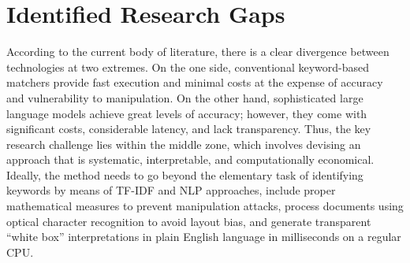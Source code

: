 \section{Identified Research Gaps}
According to the current body of literature, there is a clear divergence between technologies at two extremes. On the one side, conventional keyword-based matchers provide fast execution and minimal costs at the expense of accuracy and vulnerability to manipulation. On the other hand, sophisticated large language models achieve great levels of accuracy; however, they come with significant costs, considerable latency, and lack transparency. Thus, the key research challenge lies within the middle zone, which involves devising an approach that is systematic, interpretable, and computationally economical. Ideally, the method needs to go beyond the elementary task of identifying keywords by means of TF-IDF and NLP approaches, include proper mathematical measures to prevent manipulation attacks, process documents using optical character recognition to avoid layout bias, and generate transparent “white box” interpretations in plain English language in milliseconds on a regular CPU.
